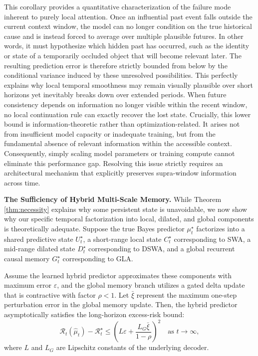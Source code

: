 \begin{remark}
\normalfont This corollary provides a quantitative characterization of the failure mode inherent to purely local attention. Once an influential past event falls outside the current context window, the model can no longer condition on the true historical cause and is instead forced to average over multiple plausible futures. In other words, it must hypothesize which hidden past has occurred, such as the identity or state of a temporarily occluded object that will become relevant later. The resulting prediction error is therefore strictly bounded from below by the conditional variance induced by these unresolved possibilities. This perfectly explains why local temporal smoothness may remain visually plausible over short horizons yet inevitably breaks down over extended periods. When future consistency depends on information no longer visible within the recent window, no local continuation rule can exactly recover the lost state. Crucially, this lower bound is information-theoretic rather than optimization-related. It arises not from insufficient model capacity or inadequate training, but from the fundamental absence of relevant information within the accessible context. Consequently, simply scaling model parameters or training compute cannot eliminate this performance gap. Resolving this issue strictly requires an architectural mechanism that explicitly preserves supra-window information across time.
\end{remark}

\textbf{The Sufficiency of Hybrid Multi-Scale Memory.}
While Theorem \ref{thm:necessity} explains why some persistent state is unavoidable, we now show why our specific temporal factorization into local, dilated, and global components is theoretically adequate. Suppose the true Bayes predictor $\mu_t^\star$ factorizes into a shared predictive state $U_t^\star$, a short-range local state $C_t^\star$ corresponding to SWA, a mid-range dilated state $D_t^\star$ corresponding to DSWA, and a global recurrent causal memory $G_t^\star$ corresponding to GLA.

\begin{theorem}
\label{thm:sufficiency}
Assume the learned hybrid predictor approximates these components with maximum error $\varepsilon$, and the global memory branch utilizes a gated delta update that is contractive with factor $\rho < 1$. Let $\bar{\xi}$ represent the maximum one-step perturbation error in the global memory update. Then, the hybrid predictor asymptotically satisfies the long-horizon excess-risk bound:
\begin{equation}
\mathcal{R}_t(\hat{\mu}_t) - \mathcal{R}_t^\star \le \left( L\varepsilon + \frac{L_G \bar{\xi}}{1-\rho} \right)^2 \quad \text{as } t \to \infty,
\end{equation}
where $L$ and $L_G$ are Lipschitz constants of the underlying decoder.
\end{theorem}

